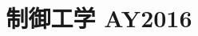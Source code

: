 \documentclass[11pt,a4paper]{article}
\title{制御工学 AY2016}
\author{}
\date{}
\begin{document}
\maketitle


\bigskip

\end{document}
